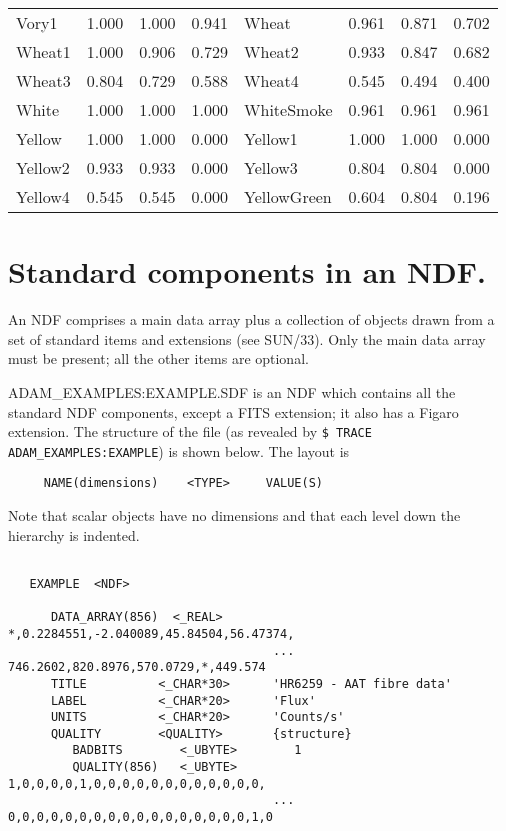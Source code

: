 {\begin{center}
\begin{tabular}{|l|l|l|l|l|l|l|l|}
Vory1               & 1.000 & 1.000 & 0.941 & Wheat               & 0.961 & 0.871 & 0.702 \\ 
Wheat1              & 1.000 & 0.906 & 0.729 & Wheat2              & 0.933 & 0.847 & 0.682 \\ 
Wheat3              & 0.804 & 0.729 & 0.588 & Wheat4              & 0.545 & 0.494 & 0.400 \\ 
White               & 1.000 & 1.000 & 1.000 & WhiteSmoke          & 0.961 & 0.961 & 0.961 \\ 
Yellow              & 1.000 & 1.000 & 0.000 & Yellow1             & 1.000 & 1.000 & 0.000 \\ 
Yellow2             & 0.933 & 0.933 & 0.000 & Yellow3             & 0.804 & 0.804 & 0.000 \\ 
Yellow4             & 0.545 & 0.545 & 0.000 & YellowGreen         & 0.604 & 0.804 & 0.196 \\ 
\hline
\end{tabular}
\end{center}

\newpage
\section{Standard components in an NDF.}
\label{ap:NDFformat}

An NDF comprises a main data array plus a collection of objects drawn from 
a set of standard items and extensions (see SUN/33).
Only the main data array must be present; all the other items are optional.

ADAM\_EXAMPLES:EXAMPLE.SDF is an NDF which contains all the standard 
NDF components, except a FITS extension; it also has a Figaro extension.
The structure of the file 
(as revealed by {\tt \$ TRACE ADAM\_EXAMPLES:EXAMPLE}) is shown below.
The layout is
\begin{verbatim} 
     NAME(dimensions)    <TYPE>     VALUE(S)
\end{verbatim}
Note that scalar objects have no dimensions and that each level down the
hierarchy is indented.


\begin{verbatim}

   EXAMPLE  <NDF>

      DATA_ARRAY(856)  <_REAL>       *,0.2284551,-2.040089,45.84504,56.47374,
                                     ... 746.2602,820.8976,570.0729,*,449.574
      TITLE          <_CHAR*30>      'HR6259 - AAT fibre data'
      LABEL          <_CHAR*20>      'Flux'
      UNITS          <_CHAR*20>      'Counts/s'
      QUALITY        <QUALITY>       {structure}
         BADBITS        <_UBYTE>        1
         QUALITY(856)   <_UBYTE>        1,0,0,0,0,1,0,0,0,0,0,0,0,0,0,0,0,0,
                                     ... 0,0,0,0,0,0,0,0,0,0,0,0,0,0,0,0,0,1,0


\end{verbatim}}

